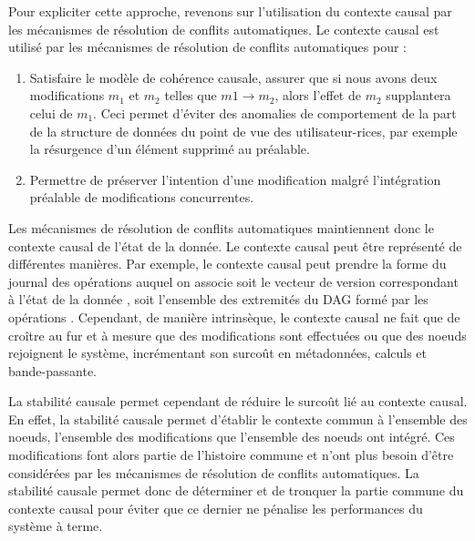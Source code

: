 Pour expliciter cette approche, revenons sur l'utilisation du contexte causal par les mécanismes de résolution de conflits automatiques.
Le contexte causal est utilisé par les mécanismes de résolution de conflits automatiques pour :
\begin{enumerate}
    \item Satisfaire le modèle de cohérence causale, \ie assurer que si nous avons deux modifications $m_1$ et $m_2$ telles que $m1 \to m_2$, alors l'effet de $m_2$ supplantera celui de $m_1$.
        Ceci permet d'éviter des anomalies de comportement de la part de la structure de données du point de vue des utilisateur-rices, par exemple la résurgence d'un élément supprimé au préalable.
    \item Permettre de préserver l'intention d'une modification malgré l'intégration préalable de modifications concurrentes.
\end{enumerate}


Les mécanismes de résolution de conflits automatiques maintiennent donc le contexte causal de l'état de la donnée.
Le contexte causal peut être représenté de différentes manières.
Par exemple, le contexte causal peut prendre la forme du journal des opérations auquel on associe soit le vecteur de version correspondant à l'état de la donnée \cite{1988-version-vector-mattern,1991-version-vector-fidge}, soit l'ensemble des extremités du \ac{DAG} formé par les opérations \cite{1997-causal-barrier}.
Cependant, de manière intrinsèque, le contexte causal ne fait que de croître au fur et à mesure que des modifications sont effectuées ou que des noeuds rejoignent le système, incrémentant son surcoût en métadonnées, calculs et bande-passante.

La stabilité causale permet cependant de réduire le surcoût lié au contexte causal.
En effet, la stabilité causale permet d'établir le contexte commun à l'ensemble des noeuds, \ie l'ensemble des modifications que l'ensemble des noeuds ont intégré.
Ces modifications font alors partie de l'histoire commune et n'ont plus besoin d'être considérées par les mécanismes de résolution de conflits automatiques.
La stabilité causale permet donc de déterminer et de tronquer la partie commune du contexte causal pour éviter que ce dernier ne pénalise les performances du système à terme.\\

